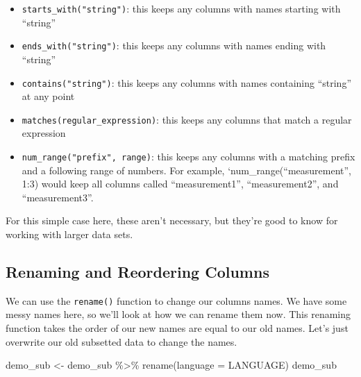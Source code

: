 \documentclass[
]{book}
\newenvironment{Shaded}{\begin{snugshade}}{\end{snugshade}}
\newcommand{\AttributeTok}[1]{\textcolor[rgb]{0.77,0.63,0.00}{#1}}
\newcommand{\FunctionTok}[1]{\textcolor[rgb]{0.00,0.00,0.00}{#1}}
\newcommand{\NormalTok}[1]{#1}
\newcommand{\OtherTok}[1]{\textcolor[rgb]{0.56,0.35,0.01}{#1}}
\newcommand{\SpecialCharTok}[1]{\textcolor[rgb]{0.00,0.00,0.00}{#1}}
\providecommand{\tightlist}{%
  \setlength{\itemsep}{0pt}\setlength{\parskip}{0pt}}
\begin{document}
\begin{itemize}
\tightlist
\item
  \texttt{starts\_with("string")}: this keeps any columns with names starting with ``string''
\item
  \texttt{ends\_with("string")}: this keeps any columns with names ending with ``string''
\item
  \texttt{contains("string")}: this keeps any columns with names containing ``string'' at any point
\item
  \texttt{matches(regular\_expression)}: this keeps any columns that match a regular expression
\item
  \texttt{num\_range("prefix",\ range)}: this keeps any columns with a matching prefix and a following range of numbers. For example, `num\_range(``measurement'', 1:3) would keep all columns called ``measurement1'', ``measurement2'', and ``measurement3''.
\end{itemize}

For this simple case here, these aren't necessary, but they're good to know for working with larger data sets.

\hypertarget{renaming-and-reordering-columns}{%
\subsection{Renaming and Reordering Columns}\label{renaming-and-reordering-columns}}

We can use the \texttt{rename()} function to change our columns names. We have some messy names here, so we'll look at how we can rename them now. This renaming function takes the order of our new names are equal to our old names. Let's just overwrite our old subsetted data to change the names.

\begin{Shaded}
\begin{Highlighting}[]
\NormalTok{demo\_sub }\OtherTok{\textless{}{-}}\NormalTok{ demo\_sub }\SpecialCharTok{\%\textgreater{}\%} \FunctionTok{rename}\NormalTok{(}\AttributeTok{language =}\NormalTok{ LANGUAGE)}
\NormalTok{demo\_sub}
\end{Highlighting}
\end{Shaded}
\end{document}
